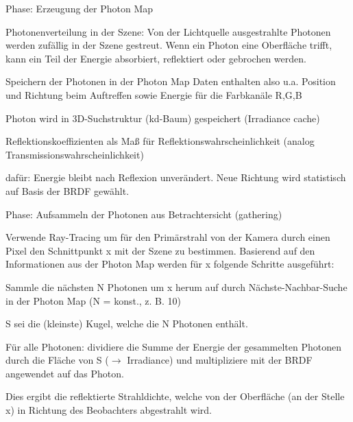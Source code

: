 \documentclass[landscape]{article}
\begin{document}
\begin{multicols}{3}
  \begin{enumerate*}
    \item Phase: Erzeugung der Photon Map
    \item Photonenverteilung in der Szene: Von der Lichtquelle ausgestrahlte Photonen werden zufällig in der Szene gestreut. Wenn ein Photon eine Oberfläche trifft, kann ein Teil der Energie absorbiert, reflektiert oder gebrochen werden.
    \item Speichern der Photonen in der Photon Map Daten enthalten also u.a. Position und Richtung beim Auftreffen sowie Energie für die Farbkanäle R,G,B
    \begin{itemize*}
      \item Photon wird in 3D-Suchstruktur (kd-Baum) gespeichert (Irradiance cache)
      \item Reflektionskoeffizienten als Maß für Reflektionswahrscheinlichkeit (analog Transmissionswahrscheinlichkeit)
      \item dafür: Energie bleibt nach Reflexion unverändert. Neue Richtung wird statistisch auf Basis der BRDF gewählt.
    \end{itemize*}
    \item  Phase: Aufsammeln der Photonen aus Betrachtersicht (gathering)
    \begin{itemize*}
      \item Verwende Ray-Tracing um für den Primärstrahl von der Kamera durch einen Pixel den Schnittpunkt x mit der Szene zu bestimmen. Basierend auf den Informationen aus der Photon Map werden für x folgende Schritte ausgeführt:
      \begin{enumerate*}
        \item Sammle die nächsten N Photonen um x herum auf durch Nächste-Nachbar-Suche in der Photon Map (N = konst., z. B. 10)
        \item S sei die (kleinste) Kugel, welche die N Photonen enthält.
        \item Für alle Photonen: dividiere die Summe der Energie der gesammelten Photonen durch die Fläche von S ($\rightarrow$ Irradiance) und multipliziere mit der  BRDF angewendet auf das Photon.
        \item Dies ergibt die reflektierte Strahldichte, welche von der Oberfläche (an der Stelle x) in Richtung des Beobachters abgestrahlt wird.
      \end{enumerate*}
    \end{itemize*}
  \end{enumerate*}
  

\end{multicols}
\end{document}
